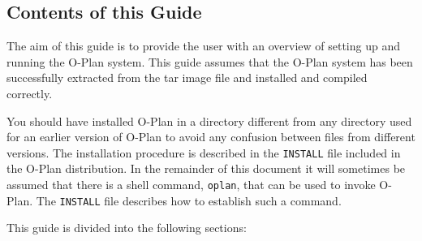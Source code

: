 

\parskip=6pt
\vfuzz=30pt
\hfuzz=30pt



\TitlePage
\Headers

\tableofcontents


\subsection{Contents of this Guide}

The aim of this guide is to provide the user with an overview of
setting up and running the O-Plan system. This guide assumes that
the O-Plan system has been successfully extracted from the tar image
file and installed and compiled correctly.

You should have installed O-Plan in a directory different from any
directory used for an earlier version of O-Plan to avoid any confusion
between files from different versions. The installation procedure is
described in the {\tt INSTALL} file included in the O-Plan
distribution. In the remainder of this document it will sometimes be
assumed that there is a shell command, {\tt oplan}, that can be used
to invoke O-Plan.  The {\tt INSTALL} file describes how to establish
such a command.

This guide is divided into the following sections:

